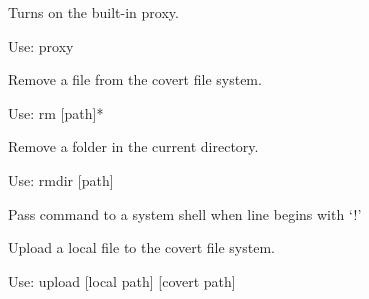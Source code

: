 \documentclass[letterpaper,12pt,openany,oneside]{sphinxmanual}
\begin{document}
\begin{fulllineitems}

\begin{fulllineitems}
\label{console:covertFS.console.Console.do_proxy}
Turns on the built-in proxy.

Use: proxy

\end{fulllineitems}


\begin{fulllineitems}
\label{console:covertFS.console.Console.do_rm}
Remove a file from the covert file system.

Use: rm {[}path{]}*

\end{fulllineitems}


\begin{fulllineitems}
\label{console:covertFS.console.Console.do_rmdir}
Remove a folder in the current directory.

Use: rmdir {[}path{]}

\end{fulllineitems}


\begin{fulllineitems}
\label{console:covertFS.console.Console.do_shell}
Pass command to a system shell when line begins with `!'

\end{fulllineitems}


\begin{fulllineitems}
\label{console:covertFS.console.Console.do_upload}
Upload a local file to the covert file system.

Use: upload {[}local path{]} {[}covert path{]}

\end{fulllineitems}



\end{fulllineitems}
\end{document}
